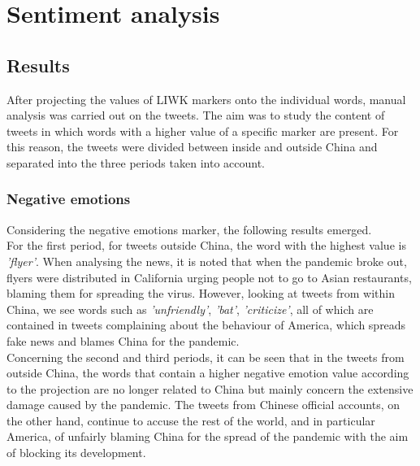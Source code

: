 \section{Sentiment analysis}
\subsection{Results}
After projecting the values of LIWK markers onto the individual words, manual analysis was carried out on the tweets. The aim was to study the content of tweets in which words with a higher value of a specific marker are present. For this reason, the tweets were divided between inside and outside China and separated into the three periods taken into account.
\subsubsection{Negative emotions}
Considering the negative emotions marker, the following results emerged.\\
For the first period, for tweets outside China, the word with the highest value is \textit{'flyer'}. When analysing the news, it is noted that when the pandemic broke out, flyers were distributed in California urging people not to go to Asian restaurants, blaming them for spreading the virus. However, looking at tweets from within China, we see words such as \textit{'unfriendly'}, \textit{'bat'}, \textit{'criticize'}, all of which are contained in tweets complaining about the behaviour of America, which spreads fake news and blames China for the pandemic.\\
Concerning the second and third periods, it can be seen that in the tweets from outside China, the words that contain a higher negative emotion value according to the projection are no longer related to China but mainly concern the extensive damage caused by the pandemic. The tweets from Chinese official accounts, on the other hand, continue to accuse the rest of the world, and in particular America, of unfairly blaming China for the spread of the pandemic with the aim of blocking its development.